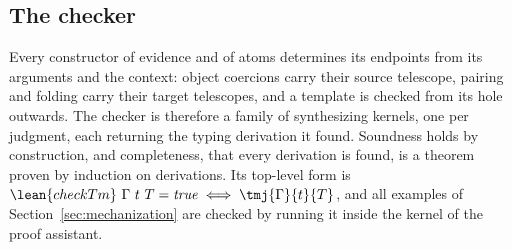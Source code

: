 \subsection{The checker}

Every constructor of evidence and of atoms determines its endpoints from its arguments and the context: object coercions carry their source telescope, pairing and folding carry their target telescopes, and a template is checked from its hole outwards. The checker is therefore a family of synthesizing kernels, one per judgment, each returning the typing derivation it found. Soundness holds by construction, and completeness, that every derivation is found, is a theorem proven by induction on derivations. Its top-level form is $\lean{checkTm}\ \Gamma\ t\ T = \mathit{true} \iff \tmj{\Gamma}{t}{T}$, and all examples of Section~\ref{sec:mechanization} are checked by running it inside the kernel of the proof assistant.
